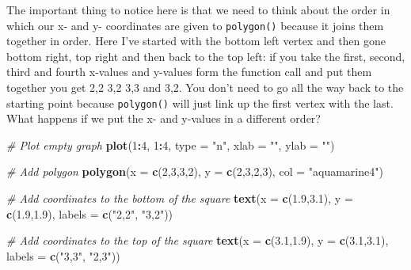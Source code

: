 \documentclass[
]{book}
\newenvironment{Shaded}{\begin{snugshade}}{\end{snugshade}}
\newcommand{\CommentTok}[1]{\textcolor[rgb]{0.56,0.35,0.01}{\textit{#1}}}
\newcommand{\DataTypeTok}[1]{\textcolor[rgb]{0.13,0.29,0.53}{#1}}
\newcommand{\DecValTok}[1]{\textcolor[rgb]{0.00,0.00,0.81}{#1}}
\newcommand{\FloatTok}[1]{\textcolor[rgb]{0.00,0.00,0.81}{#1}}
\newcommand{\KeywordTok}[1]{\textcolor[rgb]{0.13,0.29,0.53}{\textbf{#1}}}
\newcommand{\NormalTok}[1]{#1}
\newcommand{\OperatorTok}[1]{\textcolor[rgb]{0.81,0.36,0.00}{\textbf{#1}}}
\newcommand{\StringTok}[1]{\textcolor[rgb]{0.31,0.60,0.02}{#1}}
\begin{document}
The important thing to notice here is that we need to think about the order in which our x- and y- coordinates are given to \texttt{polygon()} because it joins them together in order. Here I've started with the bottom left vertex and then gone bottom right, top right and then back to the top left: if you take the first, second, third and fourth x-values and y-values form the function call and put them together you get 2,2 3,2 3,3 and 3,2. You don't need to go all the way back to the starting point because \texttt{polygon()} will just link up the first vertex with the last. What happens if we put the x- and y-values in a different order?

\begin{Shaded}
\begin{Highlighting}[]

\CommentTok{# Plot empty graph}
\KeywordTok{plot}\NormalTok{(}\DecValTok{1}\OperatorTok{:}\DecValTok{4}\NormalTok{, }\DecValTok{1}\OperatorTok{:}\DecValTok{4}\NormalTok{, }
     \DataTypeTok{type =} \StringTok{"n"}\NormalTok{, }
     \DataTypeTok{xlab =} \StringTok{""}\NormalTok{, }
     \DataTypeTok{ylab =} \StringTok{""}\NormalTok{)}

\CommentTok{# Add polygon}
\KeywordTok{polygon}\NormalTok{(}\DataTypeTok{x =} \KeywordTok{c}\NormalTok{(}\DecValTok{2}\NormalTok{,}\DecValTok{3}\NormalTok{,}\DecValTok{3}\NormalTok{,}\DecValTok{2}\NormalTok{), }
        \DataTypeTok{y =} \KeywordTok{c}\NormalTok{(}\DecValTok{2}\NormalTok{,}\DecValTok{3}\NormalTok{,}\DecValTok{2}\NormalTok{,}\DecValTok{3}\NormalTok{),}
        \DataTypeTok{col =} \StringTok{"aquamarine4"}\NormalTok{)}

\CommentTok{# Add coordinates to the bottom of the square}
\KeywordTok{text}\NormalTok{(}\DataTypeTok{x =} \KeywordTok{c}\NormalTok{(}\FloatTok{1.9}\NormalTok{,}\FloatTok{3.1}\NormalTok{), }
        \DataTypeTok{y =} \KeywordTok{c}\NormalTok{(}\FloatTok{1.9}\NormalTok{,}\FloatTok{1.9}\NormalTok{), }
        \DataTypeTok{labels =} \KeywordTok{c}\NormalTok{(}\StringTok{"2,2"}\NormalTok{, }\StringTok{"3,2"}\NormalTok{))}

\CommentTok{# Add coordinates to the top of the square}
\KeywordTok{text}\NormalTok{(}\DataTypeTok{x =} \KeywordTok{c}\NormalTok{(}\FloatTok{3.1}\NormalTok{,}\FloatTok{1.9}\NormalTok{), }
        \DataTypeTok{y =} \KeywordTok{c}\NormalTok{(}\FloatTok{3.1}\NormalTok{,}\FloatTok{3.1}\NormalTok{), }
        \DataTypeTok{labels =} \KeywordTok{c}\NormalTok{(}\StringTok{"3,3"}\NormalTok{, }\StringTok{"2,3"}\NormalTok{))}
\end{Highlighting}
\end{Shaded}
\end{document}
